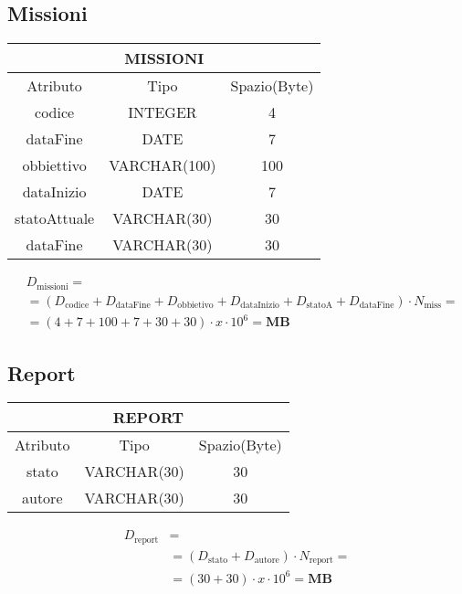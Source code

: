 \subsection{Missioni}
\begin{tabular}{ |c|c|c|}
  \hline
  \multicolumn{3}{|c|}{\textbf{MISSIONI}}\\
  \hline
  Atributo & Tipo & Spazio(Byte) \\
  \hline
  codice & INTEGER & 4 \\
  dataFine & DATE & 7 \\
  obbiettivo & VARCHAR(100) & 100 \\
  dataInizio & DATE & 7 \\
  statoAttuale  & VARCHAR(30) & 30 \\
  dataFine & VARCHAR(30) & 30 \\
  \hline
\end{tabular}
\begin{equation}
  \begin{aligned}
    &D_{\text{missioni}} =\\
    &=(D_{\text{codice}}+D_{\text{dataFine}}+D_{\text{obbietivo}}+D_{\text{dataInizio}}+D_{\text{statoA}}+D_{\text{dataFine}})\cdot N_{\text{miss}}=\\
    &=(4+7+100+7+30+30)\cdot x\cdot 10^6= \textbf{MB}
  \end{aligned}
\end{equation}
\subsection{Report}
\begin{tabular}{|c|c|c|}
  \hline
  \multicolumn{3}{|c|}{\textbf{REPORT}}\\
  \hline
  Atributo & Tipo & Spazio(Byte) \\
  \hline
  stato & VARCHAR(30) & 30 \\
  autore & VARCHAR(30) & 30\\
  \hline
\end{tabular}

\begin{equation}
  \begin{aligned}
    D_{\text{report}} &=\\
    &=(D_{\text{stato}}+D_{\text{autore}})\cdot N_{\text{report}}=\\
    &=(30+30)\cdot x\cdot 10^6= \textbf{MB}
  \end{aligned}
\end{equation}
